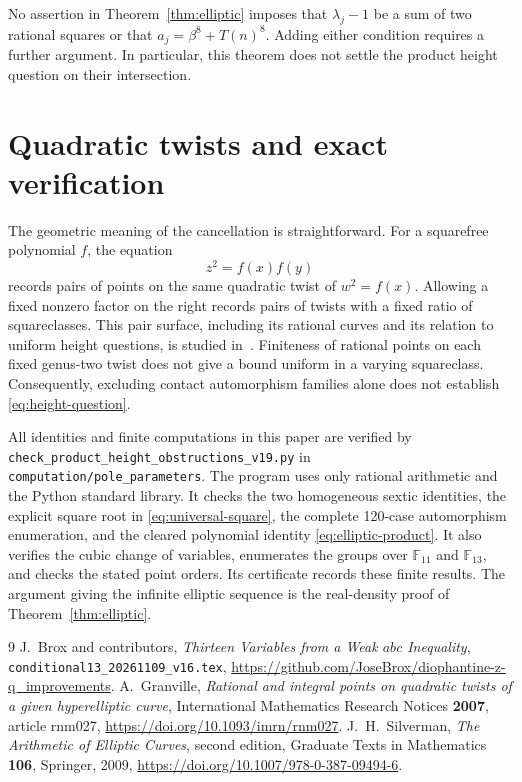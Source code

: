 \documentclass[11pt,a4paper]{article}
\begin{document}
No assertion in Theorem~\ref{thm:elliptic} imposes that
$\lambda_j-1$ be a sum of two rational squares or that
$a_j=\beta^8+T(n)^8$. Adding either condition requires a further
argument. In particular, this theorem does not settle the product
height question on their intersection.

\section{Quadratic twists and exact verification}

The geometric meaning of the cancellation is straightforward.
For a squarefree polynomial $f$, the equation
\[
                            z^2=f(x)f(y)
\]
records pairs of points on the same quadratic twist of
$w^2=f(x)$. Allowing a fixed nonzero factor on the right records
pairs of twists with a fixed ratio of squareclasses. This pair
surface, including its rational curves and its relation to uniform
height questions, is studied in~\cite[Sections~7--8]{Granville}.
Finiteness of rational points on each fixed genus-two twist does
not give a bound uniform in a varying squareclass. Consequently,
excluding contact automorphism families alone does not establish
\eqref{eq:height-question}.

All identities and finite computations in this paper are verified by
\texttt{check\_product\_height\_obstructions\_v19.py} in
\texttt{computation/pole\_parameters}. The program uses only rational
arithmetic and the Python standard library. It checks the two
homogeneous sextic identities, the explicit square root in
\eqref{eq:universal-square}, the complete 120-case automorphism
enumeration, and the cleared polynomial identity
\eqref{eq:elliptic-product}. It also verifies the cubic change of
variables, enumerates the groups over $\mathbb F_{11}$ and
$\mathbb F_{13}$, and checks the stated point orders. Its certificate
records these finite results. The argument giving the infinite
elliptic sequence is the real-density proof of
Theorem~\ref{thm:elliptic}.

\begin{thebibliography}{9}\small
{}
J.~Brox and contributors, \emph{Thirteen Variables from a Weak $abc$
Inequality},
\texttt{conditional13\_20261109\_v16.tex},
\url{https://github.com/JoseBrox/diophantine-z-q_improvements}.
A.~Granville, \emph{Rational and integral points on quadratic twists
of a given hyperelliptic curve}, International Mathematics Research
Notices \textbf{2007}, article rnm027,
\url{https://doi.org/10.1093/imrn/rnm027}.
J.~H.~Silverman, \emph{The Arithmetic of Elliptic Curves}, second
edition, Graduate Texts in Mathematics \textbf{106}, Springer, 2009,
\url{https://doi.org/10.1007/978-0-387-09494-6}.
\end{thebibliography}
\end{document}
